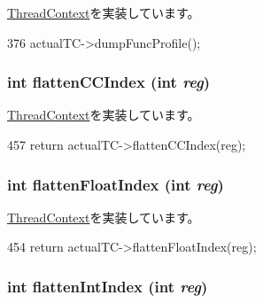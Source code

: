 \hyperlink{classThreadContext_ae3f0b63a85470c17e675083487febead}{ThreadContext}を実装しています。


\begin{DoxyCode}
376 { actualTC->dumpFuncProfile(); }
\end{DoxyCode}
\hypertarget{classProxyThreadContext_ac33d74353e36a595ec48962cd0446320}{
\subsubsection[{flattenCCIndex}]{\setlength{\rightskip}{0pt plus 5cm}int flattenCCIndex (int {\em reg})}}
\label{classProxyThreadContext_ac33d74353e36a595ec48962cd0446320}


\hyperlink{classThreadContext_aedffeaa2c4a155d5916a2ae379d77a51}{ThreadContext}を実装しています。


\begin{DoxyCode}
457     { return actualTC->flattenCCIndex(reg); }
\end{DoxyCode}
\hypertarget{classProxyThreadContext_ab9ea3f8f1a21df875c7273c7377dfac1}{
\subsubsection[{flattenFloatIndex}]{\setlength{\rightskip}{0pt plus 5cm}int flattenFloatIndex (int {\em reg})}}
\label{classProxyThreadContext_ab9ea3f8f1a21df875c7273c7377dfac1}


\hyperlink{classThreadContext_a7176627444d21b2734a0855b67e6aacf}{ThreadContext}を実装しています。


\begin{DoxyCode}
454     { return actualTC->flattenFloatIndex(reg); }
\end{DoxyCode}
\hypertarget{classProxyThreadContext_aa529f2d70520c578e3e29b3bf1a66312}{
\subsubsection[{flattenIntIndex}]{\setlength{\rightskip}{0pt plus 5cm}int flattenIntIndex (int {\em reg})}}
\label{classProxyThreadContext_aa529f2d70520c578e3e29b3bf1a66312}


